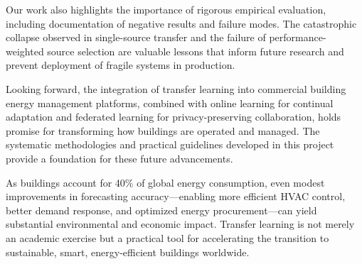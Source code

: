 \documentclass[12pt,a4paper]{report}
\begin{document}
Our work also highlights the importance of rigorous empirical evaluation, including documentation of negative results and failure modes. The catastrophic collapse observed in single-source transfer and the failure of performance-weighted source selection are valuable lessons that inform future research and prevent deployment of fragile systems in production.

Looking forward, the integration of transfer learning into commercial building energy management platforms, combined with online learning for continual adaptation and federated learning for privacy-preserving collaboration, holds promise for transforming how buildings are operated and managed. The systematic methodologies and practical guidelines developed in this project provide a foundation for these future advancements.

As buildings account for 40\% of global energy consumption, even modest improvements in forecasting accuracy—enabling more efficient HVAC control, better demand response, and optimized energy procurement—can yield substantial environmental and economic impact. Transfer learning is not merely an academic exercise but a practical tool for accelerating the transition to sustainable, smart, energy-efficient buildings worldwide.
\end{document}
